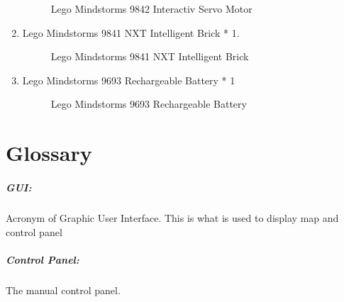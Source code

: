 \documentclass[11pt, a4paper]{report}
\begin{document}
\begin{enumerate}
\begin{figure}[ht]
		\caption{Lego Mindstorms 9842 Interactiv Servo Motor}
		\label{sec:ism}
		\label{fig:ism}
		\end{figure}
	\item  Lego Mindstorms 9841 NXT Intelligent Brick * 1.
		\begin{figure}[ht]
		\centering
		\setlength\fboxsep{2pt}
		\setlength\fboxrule{0.2pt}
		\caption{Lego Mindstorms 9841 NXT Intelligent Brick}
		\label{sec:ib}
		\label{fig:ib}
		\end{figure}
	\item  Lego Mindstorms 9693 Rechargeable Battery * 1
		\begin{figure}[ht]
		\centering
		\setlength\fboxsep{2pt}
		\setlength\fboxrule{0.2pt}
		\caption{Lego Mindstorms 9693 Rechargeable Battery}
		\label{sec:battery}
		\label{fig:battery}
		\end{figure}
\end{enumerate}





\chapter{Glossary}


\paragraph{GUI:} Acronym of Graphic User Interface. This is what is used to display map and control panel

\paragraph{Control Panel:} The manual control panel.
\end{document}
